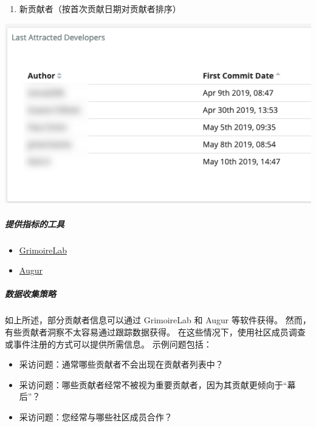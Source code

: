 \begin{enumerate}
\def\labelenumi{\arabic{enumi}.}
\setcounter{enumi}{3}
\tightlist
\item
  新贡献者（按首次贡献日期对贡献者排序）
\end{enumerate}

\includegraphics{images/contributors_first-commit-date.png}

\hypertarget{ux63d0ux4f9bux6307ux6807ux7684ux5de5ux5177}{%
\subparagraph{提供指标的工具}\label{ux63d0ux4f9bux6307ux6807ux7684ux5de5ux5177}}

\begin{itemize}
\tightlist
\item
  \href{https://chaoss.github.io/grimoirelab/}{GrimoireLab}
\item
  \href{http://augur.osshealth.io/api_docs/\#api-Evolution-Contributors_Repo_}{Augur}
\end{itemize}

\hypertarget{ux6570ux636eux6536ux96c6ux7b56ux7565}{%
\subparagraph{数据收集策略}\label{ux6570ux636eux6536ux96c6ux7b56ux7565}}

如上所述，部分贡献者信息可以通过 GrimoireLab 和 Augur 等软件获得。
然而，有些贡献者洞察不太容易通过跟踪数据获得。
在这些情况下，使用社区成员调查或事件注册的方式可以提供所需信息。
示例问题包括：

\begin{itemize}
\tightlist
\item
  采访问题：通常哪些贡献者不会出现在贡献者列表中？
\item
  采访问题：哪些贡献者经常不被视为重要贡献者，因为其贡献更倾向于``幕后''？
\item
  采访问题：您经常与哪些社区成员合作？
\end{itemize}

